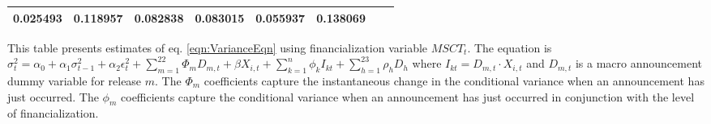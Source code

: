 \begin{sidewaystable}
{\begin{tabular}{@{}lllllllllllll@{}}
0.025493 }                                                 & \multicolumn{2}{c}{ 0.118957 }                                                 & \multicolumn{2}{c}{ 0.082838 }                                                 & \multicolumn{2}{c}{ 0.083015 }                                                 & \multicolumn{2}{c}{ 0.055937 }                                                   & \multicolumn{2}{c}{ 0.138069 }                                                 \\ \bottomrule 
\end{tabular}
}
\begin{tablenotes}\item 
        \singlespacing
        \footnotesize
        This table presents estimates of eq. \ref{eqn:VarianceEqn} using financialization variable $MSCT_t$. The equation is $\sigma_{t}^2=\alpha_0+\alpha_1 \sigma_{t-1}^2+\alpha_2 \epsilon_t^2 +\sum_{m=1}^{22} \Phi_m D_{m,t}+\beta X_{i,t}+\sum_{k=1}^n \phi_k I_{kt} + \sum_{h=1}^{23} \rho_h D_h$ where $I_{kt}=D_{m,t} \cdot X_{i,t}$ and $D_{m,t}$ is a macro announcement dummy variable for release $m$. The $\Phi_m$ coefficients capture the instantaneous change in the conditional variance when an announcement has just occurred. The $\phi_m$ coefficients capture the conditional variance when an announcement has just occurred in conjunction with the level of financialization.
\end{tablenotes}
\end{sidewaystable}

